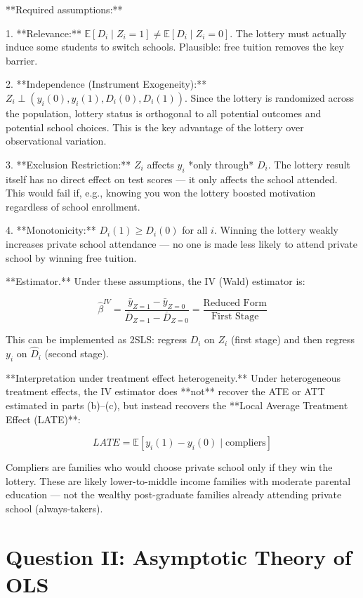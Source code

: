 \documentclass[letterpaper,12pt]{article}
\begin{document}
\begin{enumerate}[label=(\alph*)]
**Required assumptions:**

1. **Relevance:** $\mathbb{E}[D_i \mid Z_i=1] \neq \mathbb{E}[D_i \mid Z_i=0]$. The lottery must actually induce some students to switch schools. Plausible: free tuition removes the key barrier.

2. **Independence (Instrument Exogeneity):** $Z_i \perp (y_i(0), y_i(1), D_i(0), D_i(1))$. Since the lottery is randomized across the population, lottery status is orthogonal to all potential outcomes and potential school choices. This is the key advantage of the lottery over observational variation.

3. **Exclusion Restriction:** $Z_i$ affects $y_i$ *only through* $D_i$. The lottery result itself has no direct effect on test scores — it only affects the school attended. This would fail if, e.g., knowing you won the lottery boosted motivation regardless of school enrollment.

4. **Monotonicity:** $D_i(1) \geq D_i(0)$ for all $i$. Winning the lottery weakly increases private school attendance — no one is made less likely to attend private school by winning free tuition.

**Estimator.** Under these assumptions, the IV (Wald) estimator is:

$$\hat{\beta}^{IV} = \frac{\bar{y}_{Z=1} - \bar{y}_{Z=0}}{\bar{D}_{Z=1} - \bar{D}_{Z=0}} = \frac{\text{Reduced Form}}{\text{First Stage}}$$

This can be implemented as 2SLS: regress $D_i$ on $Z_i$ (first stage) and then regress $y_i$ on $\hat{D}_i$ (second stage).

**Interpretation under treatment effect heterogeneity.** Under heterogeneous treatment effects, the IV estimator does **not** recover the ATE or ATT estimated in parts (b)–(c), but instead recovers the **Local Average Treatment Effect (LATE)**:

$$LATE = \mathbb{E}[y_i(1) - y_i(0) \mid \text{compliers}]$$

Compliers are families who would choose private school only if they win the lottery. These are likely lower-to-middle income families with moderate parental education — not the wealthy post-graduate families already attending private school (always-takers). 
\end{enumerate}


\section*{Question II: Asymptotic Theory of OLS}
\end{document}
